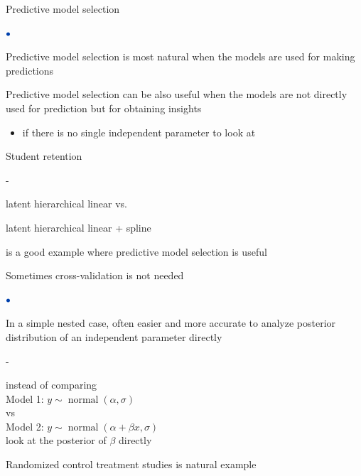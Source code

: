 \documentclass[english,t]{beamer}
\DeclareMathOperator{\normal}{normal}
\newenvironment{list1}{
   \begin{list}{$\color{list1}\bullet$}{\itemsep=6pt}}{
  \end{list}}
\newenvironment{list2}{
  \begin{list}{-}{\baselineskip=12pt\itemsep=2pt}}{
  \end{list}}
\begin{document}
\begin{frame}{Predictive model selection}

  \begin{list1}
  \item Predictive model selection is most natural when the models are
    used for making predictions
  \item Predictive model selection can be also useful when the models
    are not directly used for prediction but for obtaining insights
    \begin{itemize}
    \item if there is no single independent parameter to look at
    \end{itemize}
  \item<2-> Student retention
    \begin{list2}
      \item latent hierarchical linear vs.
      \item latent hierarchical linear + spline
      \end{list2}
      is a good example where predictive model selection is useful
  \end{list1}

\end{frame}

\begin{frame}{Sometimes cross-validation is not needed}

\begin{list1}
\item<+-> In a simple nested case, often easier and more accurate to
  analyze posterior distribution of an independent parameter directly
  \begin{list2}
  \item instead of comparing\\
    \vspace{0.2\baselineskip}
    Model 1: $y \sim \normal(\alpha, \sigma)$\\
    \vspace{0.2\baselineskip}
    vs\\
    \vspace{0.2\baselineskip}
    Model 2: $y \sim \normal(\alpha + \beta x, \sigma)$\\
    \vspace{0.2\baselineskip}
    look at the posterior of $\beta$ directly
  \end{list2}
\item<+-> Randomized control treatment studies is natural example 
\end{list1}

\end{frame}
\end{document}
